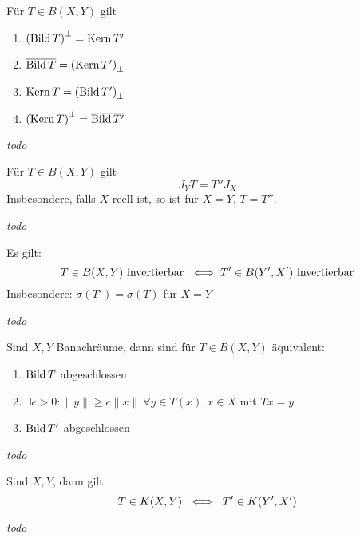 \begin{prop}
	Für $T \in B(X, Y)$ gilt
	\begin{enumerate}[label=(\roman*\upshape)]
		\item $\left( \mathop{\rm Bild}\nolimits T \right)^{\bot} = \mathop{\rm Kern}\nolimits T'$
		\item $\overline{\mathop{\rm Bild}\nolimits T} = \left( \mathop{\rm Kern}\nolimits T' \right)_{\bot}$
		\item $\mathop{\rm Kern}\nolimits T = \left( \mathop{\rm Bild}\nolimits T' \right)_{\bot}$
		\item $\left( \mathop{\rm Kern}\nolimits T \right)^{\bot} = \overline{\mathop{\rm Bild}\nolimits T'}$
	\end{enumerate}
\end{prop}

\begin{beweis}
	\textit{todo} %
\end{beweis}


\begin{prop}
	Für $T \in B(X, Y)$ gilt
	\[ J_{Y} T = T'' J_{X} \]
	Insbesondere, falls $X$ reell ist, so ist für $X = Y$, $T = T''$.
\end{prop}

\begin{beweis}
	\textit{todo} %
\end{beweis}


\begin{satz}
	Es gilt:
	\[ T \in B(X, Y) \text{ invertierbar } \iff T' \in B(Y', X') \text{ invertierbar} \]
	Insbesondere: $\sigma(T') = \sigma(T)$ für $X = Y$
\end{satz}

\begin{beweis}
	\textit{todo} %
\end{beweis}


\begin{satz} 
	Sind $X, Y$ Banachräume, dann sind für $T \in B(X, Y)$  äquivalent:
	\begin{enumerate}[label=(\roman*\upshape)]
		\item $\mathop{\rm Bild}\nolimits T$ abgeschlossen
		\item $\exists c > 0 : \| y \| \geq c \| x \| ~ \forall y \in T(x), x \in X$ mit $T x = y$
		\item $\mathop{\rm Bild}\nolimits T'$ abgeschlossen
	\end{enumerate}
\end{satz}

\begin{beweis}
	\textit{todo} %
\end{beweis}


\begin{satz}[Schauder] 
	Sind $X, Y$,  dann gilt
	\[ T \in K(X, Y) ~ \iff ~ T' \in K(Y', X') \]
\end{satz}

\begin{beweis}
	\textit{todo} %
\end{beweis}


\newpage